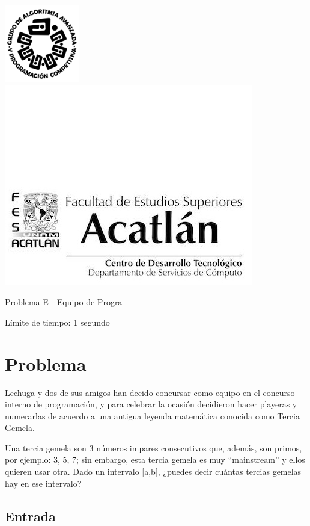 \includegraphics[scale=0.6]{logo} \hspace*{9.00cm}
\includegraphics[scale=0.5]{dsc} 
\bigskip
\begin{center}
	\Large Problema E - Equipo de Progra
\end{center}

\begin{flushright}
Límite de tiempo: 1 segundo
\par\end{flushright}
\bigskip

\section*{Problema}

Lechuga y dos de sus amigos han decido concursar como equipo en el concurso interno de programación, y para celebrar la ocasión decidieron hacer playeras y numerarlas de acuerdo a una antigua leyenda matemática conocida como Tercia Gemela.

Una tercia gemela son 3 números impares consecutivos que, además, son primos, por ejemplo: 3, 5, 7; sin embargo, esta tercia gemela es muy \enquote{mainstream} y ellos quieren usar otra.
Dado un intervalo [a,b], ¿puedes decir cuántas tercias gemelas hay en ese intervalo?

\subsection*{Entrada}

